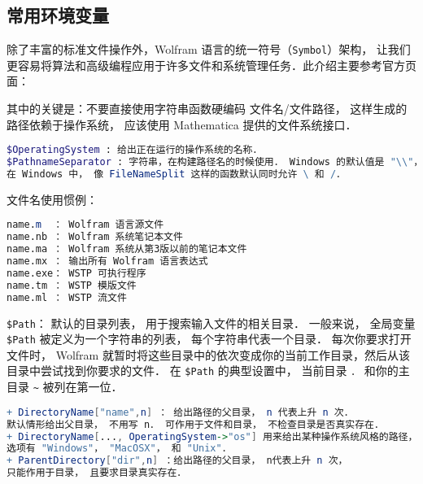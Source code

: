 
\begin{issues}
\issueDraft
\issueTODO
\end{issues}

\subsection{常用环境变量}

除了丰富的标准文件操作外，Wolfram 语言的统一符号（\verb`Symbol`）架构，
让我们更容易将算法和高级编程应用于许多文件和系统管理任务．此介绍主要参考官方页面：


其中的关键是：不要直接使用字符串函数硬编码 文件名/文件路径， 
这样生成的路径依赖于操作系统， 应该使用 Mathematica 提供的文件系统接口．

\begin{lstlisting}[language=mathematica]
$OperatingSystem : 给出正在运行的操作系统的名称．
$PathnameSeparator : 字符串，在构建路径名的时候使用． Windows 的默认值是 "\\"， 其他系统是 "/"．
在 Windows 中， 像 FileNameSplit 这样的函数默认同时允许 \ 和 /．
\end{lstlisting}

文件名使用惯例：

\begin{lstlisting}[language=mathematica]
name.m  ： Wolfram 语言源文件
name.nb ： Wolfram 系统笔记本文件
name.ma ： Wolfram 系统从第3版以前的笔记本文件
name.mx ： 输出所有 Wolfram 语言表达式
name.exe： WSTP 可执行程序
name.tm ： WSTP 模版文件
name.ml ： WSTP 流文件
\end{lstlisting}


\verb`$Path`： 默认的目录列表， 用于搜索输入文件的相关目录． 
一般来说， 全局变量 \verb`$Path` 被定义为一个字符串的列表， 每个字符串代表一个目录．
每次你要求打开文件时， Wolfram 就暂时将这些目录中的依次变成你的当前工作目录，然后从该目录中尝试找到你要求的文件．
在 \verb`$Path` 的典型设置中， 当前目录 \verb`．` 和你的主目录 \verb`~` 被列在第一位．

\begin{lstlisting}[language=mathematica]
+ DirectoryName["name",n] ： 给出路径的父目录， n 代表上升 n 次． 
默认情形给出父目录， 不用写 n． 可作用于文件和目录， 不检查目录是否真实存在．
+ DirectoryName[..., OperatingSystem->"os"] 用来给出某种操作系统风格的路径， 
选项有 "Windows"， "MacOSX"， 和 "Unix"．
+ ParentDirectory["dir",n] ：给出路径的父目录， n代表上升 n 次， 
只能作用于目录， 且要求目录真实存在．
\end{lstlisting}

